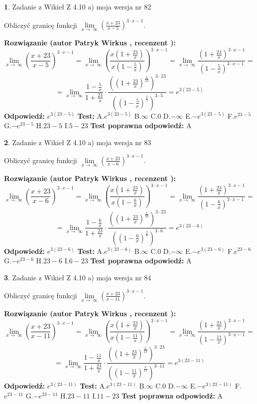 \documentclass[12pt, a4paper]{article}
\theoremstyle{definition} %
\newtheorem{zad}{}
\newcommand{\zadStart}[1]{\begin{zad}#1\newline}
\newcommand{\zadStop}{\end{zad}}
\newcommand{\rozwStart}[2]{\noindent \textbf{Rozwiązanie (autor #1 , recenzent #2): }\newline}
\newcommand{\rozwStop}{\newline}
\newcommand{\odpStart}{\noindent \textbf{Odpowiedź:}\newline}
\newcommand{\odpStop}{\newline}
\newcommand{\testStart}{\noindent \textbf{Test:}\newline}
\newcommand{\testStop}{\newline}
\newcommand{\kluczStart}{\noindent \textbf{Test poprawna odpowiedź:}\newline}
\newcommand{\kluczStop}{\newline}
\begin{document}
\zadStart{Zadanie z Wikieł Z 4.10 a) moja wersja nr 82}


Obliczyć granicę funkcji  $\lim\limits_{x\to\ \infty}(\frac{x+23}{x-5})^{3\cdot x-1}$.
\zadStop
\rozwStart{Patryk Wirkus}{}
$$\lim\limits_{x\to\ \infty}(\frac{x+23}{x-5})^{3\cdot x-1} = \lim\limits_{x\to\ \infty}(\frac{x(1+\frac{23}{x})}{x(1-\frac{5}{x})})^{3\cdot x-1}=\lim\limits_{x\to\ \infty}\frac{(1+\frac{23}{x})^{3\cdot x-1}}{(1-\frac{5}{x})^{3\cdot x-1}}=$$
$$=\lim\limits_{x\to\ \infty}\frac{1-\frac{5}{x}}{1+\frac{23}{x}}\cdot\frac{((1+\frac{23}{x})^{\frac{x}{23}})^{3\cdot23}}{((1-\frac{5}{x})^{\frac{x}{5}})^{3\cdot5}}=e^{3(23-5)}$$
\rozwStop
\odpStart
$e^{3(23-5)}$
\odpStop
\testStart
A.$e^{3(23-5)}$ B.$\infty$ C.$0$ D.$-\infty$ E.$-e^{3(23-5)}$
F.$e^{23-5}$ G.$-e^{23-5}$
H.$23-5$
I.$5-23$
\testStop
\kluczStart
A
\kluczStop



\zadStart{Zadanie z Wikieł Z 4.10 a) moja wersja nr 83}


Obliczyć granicę funkcji  $\lim\limits_{x\to\ \infty}(\frac{x+23}{x-6})^{3\cdot x-1}$.
\zadStop
\rozwStart{Patryk Wirkus}{}
$$\lim\limits_{x\to\ \infty}(\frac{x+23}{x-6})^{3\cdot x-1} = \lim\limits_{x\to\ \infty}(\frac{x(1+\frac{23}{x})}{x(1-\frac{6}{x})})^{3\cdot x-1}=\lim\limits_{x\to\ \infty}\frac{(1+\frac{23}{x})^{3\cdot x-1}}{(1-\frac{6}{x})^{3\cdot x-1}}=$$
$$=\lim\limits_{x\to\ \infty}\frac{1-\frac{6}{x}}{1+\frac{23}{x}}\cdot\frac{((1+\frac{23}{x})^{\frac{x}{23}})^{3\cdot23}}{((1-\frac{6}{x})^{\frac{x}{6}})^{3\cdot6}}=e^{3(23-6)}$$
\rozwStop
\odpStart
$e^{3(23-6)}$
\odpStop
\testStart
A.$e^{3(23-6)}$ B.$\infty$ C.$0$ D.$-\infty$ E.$-e^{3(23-6)}$
F.$e^{23-6}$ G.$-e^{23-6}$
H.$23-6$
I.$6-23$
\testStop
\kluczStart
A
\kluczStop



\zadStart{Zadanie z Wikieł Z 4.10 a) moja wersja nr 84}


Obliczyć granicę funkcji  $\lim\limits_{x\to\ \infty}(\frac{x+23}{x-11})^{3\cdot x-1}$.
\zadStop
\rozwStart{Patryk Wirkus}{}
$$\lim\limits_{x\to\ \infty}(\frac{x+23}{x-11})^{3\cdot x-1} = \lim\limits_{x\to\ \infty}(\frac{x(1+\frac{23}{x})}{x(1-\frac{11}{x})})^{3\cdot x-1}=\lim\limits_{x\to\ \infty}\frac{(1+\frac{23}{x})^{3\cdot x-1}}{(1-\frac{11}{x})^{3\cdot x-1}}=$$
$$=\lim\limits_{x\to\ \infty}\frac{1-\frac{11}{x}}{1+\frac{23}{x}}\cdot\frac{((1+\frac{23}{x})^{\frac{x}{23}})^{3\cdot23}}{((1-\frac{11}{x})^{\frac{x}{11}})^{3\cdot11}}=e^{3(23-11)}$$
\rozwStop
\odpStart
$e^{3(23-11)}$
\odpStop
\testStart
A.$e^{3(23-11)}$ B.$\infty$ C.$0$ D.$-\infty$ E.$-e^{3(23-11)}$
F.$e^{23-11}$ G.$-e^{23-11}$
H.$23-11$
I.$11-23$
\testStop
\kluczStart
A
\kluczStop
\end{document}
